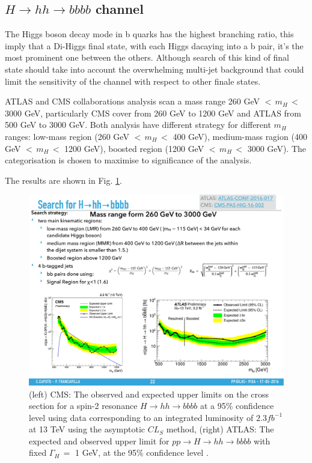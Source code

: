 \subsection{$H\rightarrow hh \rightarrow bbbb$ channel}
The Higgs boson decay mode in b quarks has the highest branching ratio, this imply that a Di-Higgs final state, with each Higgs dacaying into a b pair, it's the most prominent one between the others. Although search of this kind of final state should take into account the overwhelming multi-jet background that could limit the sensitivity of the channel with respect to other finale states.

ATLAS and CMS collaborations analysis scan a mass range 260 GeV $ < \, m_{H}  \,< $ 3000 GeV, particularly CMS cover from 260 GeV to 1200 GeV and ATLAS from 500 GeV to 3000 GeV. Both analysis have different strategy for different $m_H$ ranges: low-mass region (260 GeV $ < \, m_{H}  \,< $ 400 GeV), medium-mass ragion (400 GeV $ < \, m_{H}  \,< $ 1200 GeV), boosted region (1200 GeV $ < \, m_{H}  \,< $ 3000 GeV). The categorisation is chosen to maximise to significance of the analysis. 

The results are shown in Fig. \ref{fig:HH_bbbb}.
\begin{figure}[htb]
\centering
	\includegraphics[width=1.0\textwidth, angle=0] {figures/HH_bbbb.pdf}
\caption{(left) CMS: The observed and expected upper limits on the cross section for a spin-2 resonance
$H\rightarrow hh\rightarrow bbbb$ at a 95\% confidence level using data corresponding to an integrated luminosity
of $2.3 fb^{-1}$ at 13 TeV using the asymptotic $CL_S$ method, (right) ATLAS: The expected and observed upper limit for $pp\rightarrow H\rightarrow hh\rightarrow bbbb$ with fixed $\Gamma_H \,=$ 1 GeV, at the 95\% confidence level .}
\label{fig:HH_bbbb}   
\end{figure}

